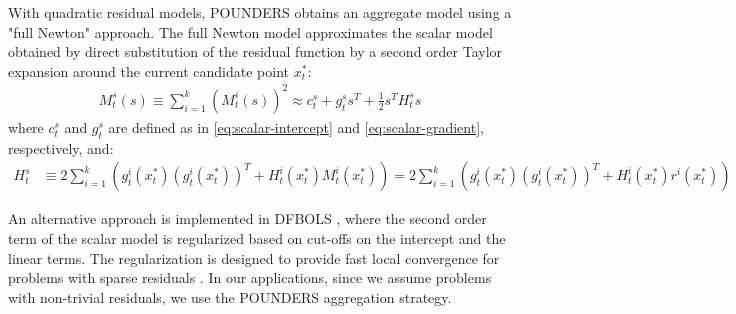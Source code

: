 With quadratic residual models, POUNDERS obtains an aggregate model using a "full Newton" approach. The full Newton model approximates the scalar model obtained by direct substitution of the residual function by a second order Taylor expansion around the current candidate point $x_t^*$:
\begin{align}
    M^s_t(s)\equiv\sum\limits_{i=1}^k(M_t^i(s))^2\approx c_t^s+g^s_ts^T+\frac{1}{2}s^TH^s_ts
    \label{eq:taylor-exp}
\end{align}
where $c_t^s$ and $g_t^s$ are defined as in \ref{eq:scalar-intercept} and \ref{eq:scalar-gradient}, respectively, and:
\begin{align}
     H_t^s&\equiv2\sum\limits_{i=1}^k(g_t^i(x_t^*)(g_t^i(x_t^*))^T+H_t^i(x_t^*)M_t^i(x_t^*))=2\sum\limits_{i=1}^k(g_t^i(x_t^*)(g_t^i(x_t^*))^T+H_t^i(x_t^*)r^i(x_t^*))\label{eq:scalar-hessian-quadratic}
\end{align}

An alternative approach is implemented in DFBOLS \citep{Zhang2010}, where the second order term of the scalar model is regularized based on cut-offs on the intercept and the linear terms. The regularization is designed to provide fast local convergence for problems with sparse residuals \citep{Zhang2010}. In our applications, since we assume problems with non-trivial residuals, we use the POUNDERS aggregation strategy.
